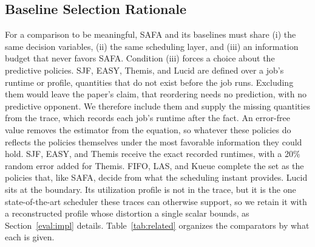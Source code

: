 \documentclass{ieeetj}
\begin{document}
\subsection{Baseline Selection Rationale}\label{baseline-rationale}
For a comparison to be meaningful, SAFA and its baselines must share (i) the same decision variables, (ii) the same scheduling layer, and (iii) an information budget that never favors SAFA. Condition (iii) forces a choice about the predictive policies. SJF, EASY, Themis, and Lucid are defined over a job's runtime or profile, quantities that do not exist before the job runs. Excluding them would leave the paper's claim, that reordering needs no prediction, with no predictive opponent. We therefore include them and supply the missing quantities from the trace, which records each job's runtime after the fact. An error-free value removes the estimator from the equation, so whatever these policies do reflects the policies themselves under the most favorable information they could hold. SJF, EASY, and Themis receive the exact recorded runtimes, with a 20\% random error added for Themis. FIFO, LAS, and Kueue complete the set as the policies that, like SAFA, decide from what the scheduling instant provides. Lucid sits at the boundary. Its utilization profile is not in the trace, but it is the one state-of-the-art scheduler these traces can otherwise support, so we retain it with a reconstructed profile whose distortion a single scalar bounds, as Section~\ref{eval:impl} details. Table~\ref{tab:related} organizes the comparators by what each is given.
\end{document}
